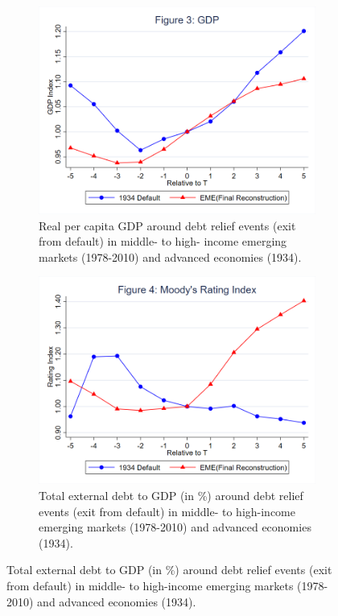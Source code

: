 \begin{figure}[ht!]
    \centering
    \begin{subfigure}[b]{0.48\textwidth}
        \centering
        \includegraphics[width=\textwidth]{figures/Figure3_GDP_Comparison.png}
        \caption{Real per capita GDP around debt relief events (exit from default) in middle- to high-
income emerging markets (1978-2010) and advanced economies (1934).}
        \label{fig:3}
    \end{subfigure}
    \hfill
    \begin{subfigure}[b]{0.48\textwidth}
        \centering
        \includegraphics[width=\textwidth]{figures/Figure4_Rating_Comparison.png}
        \caption{Total external debt to GDP (in \%) around debt relief events (exit from default) in
        middle- to high-income emerging markets (1978-2010) and advanced economies (1934).}
        \label{fig:4}
    \end{subfigure}
\end{figure}

